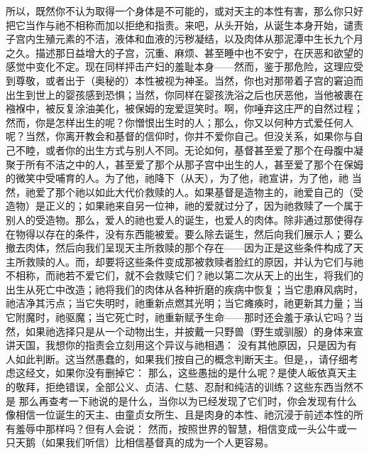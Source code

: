 所以，既然你不认为取得一个身体是不可能的，或对天主的本性有害，那么你只好把它当作与祂不相称而加以拒绝和指责。来吧，从头开始，从诞生本身开始，谴责子宫内生殖元素的不洁，液体和血液的污秽凝结，以及肉体从那泥潭中生长九个月之久。描述那日益增大的子宫，沉重、麻烦、甚至睡中也不安宁，在厌恶和欲望的感觉中变化不定。现在同样抨击产妇的羞耻本身——然而，鉴于那危险，这理应受到尊敬，或者出于（奥秘的）本性被视为神圣。当然，你也对那带着子宫的窘迫而出生到世上的婴孩感到恐惧；当然，你同样在婴孩洗浴之后也厌恶他，当他被裹在襁褓中，被反复涂油美化，被保姆的宠爱逗笑时。啊，你唾弃这庄严的自然过程；然而，你是怎样出生的呢？你憎恨出生时的人；那么，你又以何种方式爱任何人呢？当然，你离开教会和基督的信仰时，你并不爱你自己。但没关系，如果你与自己不睦，或者你的出生方式与别人不同。无论如何，基督甚至爱了那个在母腹中凝聚于所有不洁之中的人，甚至爱了那个从那子宫中出生的人，甚至爱了那个在保姆的微笑中受哺育的人。为了他，祂降下（从天），为了他，祂宣讲，为了他，祂 当然，祂爱了那个祂以如此大代价救赎的人。如果基督是造物主的，祂爱自己的（受造物）是正义的；如果祂来自另一位神，祂的爱就过分了，因为祂救赎了一个属于别人的受造物。那么，爱人的祂也爱人的诞生，也爱人的肉体。除非通过那使得存在物得以存在的条件，没有东西能被爱。要么除去诞生，然后向我们展示人；要么撤去肉体，然后向我们呈现天主所救赎的那个存在——因为正是这些条件构成了天主所救赎的人。而，却要将这些条件变成那被救赎者脸红的原因，并认为它们与祂不相称，而祂若不爱它们，就不会救赎它们？祂以第二次从天上的出生，将我们的出生从死亡中改造；祂将我们的肉体从各种折磨的疾病中恢复；当它患麻风病时，祂洁净其污点；当它失明时，祂重新点燃其光明；当它瘫痪时，祂更新其力量；当它附魔时，祂驱魔；当它死亡时，祂重新赋予生命——那时还会羞于承认它吗？当然，如果祂选择只是从一个动物出生，并披戴一只野兽（野生或驯服）的身体来宣讲天国，我想你的指责会立刻用这个异议与祂相遇： 没有其他原因，只是因为有人如此判断。这当然愚蠢的，如果我们按自己的概念判断天主。但是，，请仔细考虑这经文，如果你没有删掉它： 那么，这些愚拙的是什么呢？是使人皈依真天主的敬拜，拒绝错误，全部公义、贞洁、仁慈、忍耐和纯洁的训练？这些东西当然不是 那么再查考一下祂说的是什么，当你以为已经发现了它们时，你会发现有什么像相信一位诞生的天主、由童贞女所生、且是肉身的本性、祂沉浸于前述本性的所有羞辱中那样吗？但有人会说： 然而，按照世界的智慧，相信变成一头公牛或一只天鹅（如果我们听信）比相信基督真的成为一个人更容易。\par

